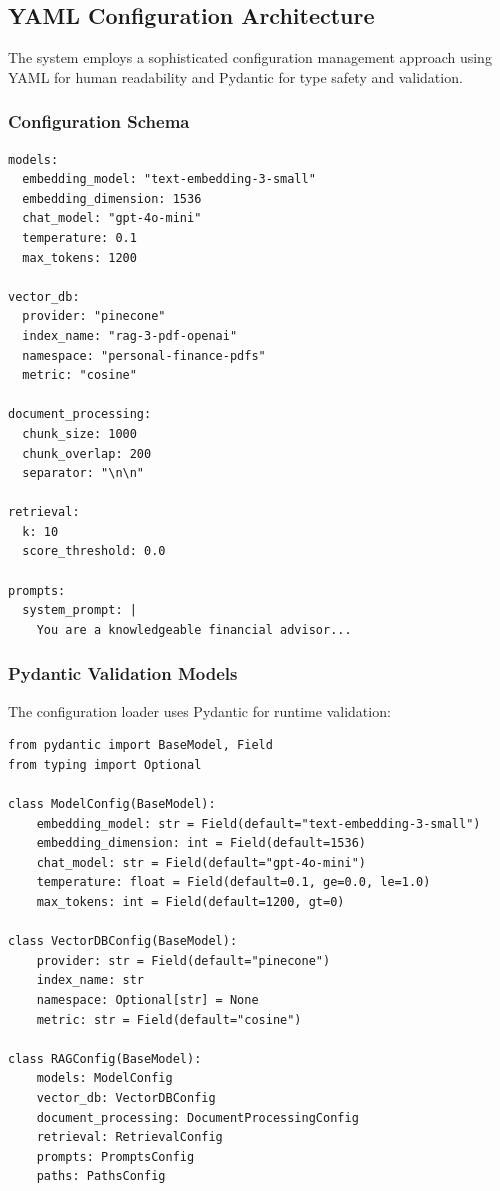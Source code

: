 \documentclass[12pt,a4paper]{article}
\begin{document}
\subsection{YAML Configuration Architecture}

The system employs a sophisticated configuration management approach using YAML for human readability and Pydantic for type safety and validation.

\subsubsection{Configuration Schema}

\begin{lstlisting}[caption=Configuration Structure (config/rag\_config.yaml)]
models:
  embedding_model: "text-embedding-3-small"
  embedding_dimension: 1536
  chat_model: "gpt-4o-mini"
  temperature: 0.1
  max_tokens: 1200
  
vector_db:
  provider: "pinecone"
  index_name: "rag-3-pdf-openai"
  namespace: "personal-finance-pdfs"
  metric: "cosine"
  
document_processing:
  chunk_size: 1000
  chunk_overlap: 200
  separator: "\n\n"
  
retrieval:
  k: 10
  score_threshold: 0.0
  
prompts:
  system_prompt: |
    You are a knowledgeable financial advisor...
\end{lstlisting}

\subsubsection{Pydantic Validation Models}

The configuration loader uses Pydantic for runtime validation:

\begin{lstlisting}[caption=Configuration Validation (src/config/config\_loader.py)]
from pydantic import BaseModel, Field
from typing import Optional

class ModelConfig(BaseModel):
    embedding_model: str = Field(default="text-embedding-3-small")
    embedding_dimension: int = Field(default=1536)
    chat_model: str = Field(default="gpt-4o-mini")
    temperature: float = Field(default=0.1, ge=0.0, le=1.0)
    max_tokens: int = Field(default=1200, gt=0)

class VectorDBConfig(BaseModel):
    provider: str = Field(default="pinecone")
    index_name: str
    namespace: Optional[str] = None
    metric: str = Field(default="cosine")

class RAGConfig(BaseModel):
    models: ModelConfig
    vector_db: VectorDBConfig
    document_processing: DocumentProcessingConfig
    retrieval: RetrievalConfig
    prompts: PromptsConfig
    paths: PathsConfig
\end{lstlisting}
\end{document}
